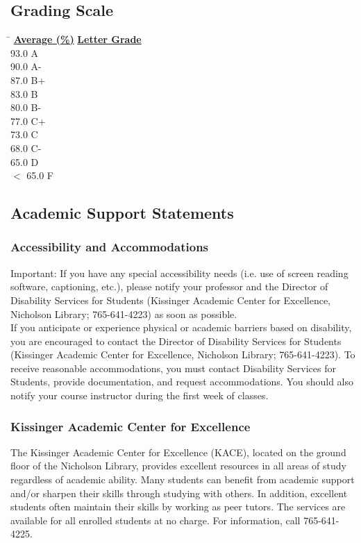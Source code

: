 \documentclass[12pt,letterpaper,onecolumn]{report}
\begin{document}
\subsection*{Grading Scale}
\begin{tabbing}
\hspace{3in}\=\kill
\textbf{\underline{Average (\%)}} \> \textbf{\underline{Letter Grade}} \\  
93.0 \> A \\ 
90.0 \> A-\\
87.0 \> B+\\
83.0 \> B\\
80.0 \> B-\\
77.0 \> C+\\
73.0 \> C\\
68.0 \> C-\\
65.0 \> D\\
$<$ 65.0 \> F\\
\end{tabbing}

\subsection*{Academic Support Statements}
\subsubsection*{Accessibility and Accommodations}
Important: If you have any special accessibility needs (i.e. use of screen reading software, captioning, etc.), please notify your professor and the Director of Disability Services for Students (Kissinger Academic Center for Excellence, Nicholson Library; 765-641-4223) as soon as possible.\\
 
\noindent If you anticipate or experience physical or academic barriers based on disability, you are encouraged to contact the Director of Disability Services for Students (Kissinger Academic Center for Excellence, Nicholson Library; 765-641-4223). To receive reasonable accommodations, you must contact Disability Services for Students, provide documentation, and request accommodations. You should also notify your course instructor during the first week of classes.

\subsubsection*{Kissinger Academic Center for Excellence}
The Kissinger Academic Center for Excellence (KACE), located on the ground floor of the Nicholson Library, provides excellent resources in all areas of study regardless of academic ability. Many students can benefit from academic support and/or sharpen their skills through studying with others. In addition, excellent students often maintain their skills by working as peer tutors. The services are available for all enrolled students at no charge. For information, call 765-641-4225.
\end{document}
